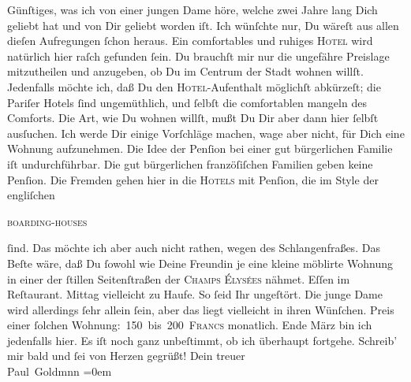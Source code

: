 \begin{ledgroupsized}[t]{13cm}
               Günſtiges,  was ich von einer jungen Dame höre, welche zwei Jahre
               lang Dich geliebt hat und von Dir geliebt worden iſt. {\pb}Ich wünſchte nur, Du wäreſt aus allen dieſen
               Aufregungen ſchon heraus.\pend
           \pstart
           Ein comfortables und ruhiges \textsc{Hotel} wird natürlich hier  raſch gefunden ſein. Du brauchſt mir nur die
               ungefähre  Preislage mitzutheilen und anzugeben,
               ob Du im Centrum der Stadt
               wohnen willſt. Jedenfalls möchte ich, daß Du den \textsc{Hotel}-Aufenthalt möglichſt abkürzeſt; die Pariſer Hotels ſind ungemüthlich, und ſelbſt die comfortablen mangeln des
               Comforts. Die Art, wie Du wohnen willſt, mußt Du Dir aber dann hier ſelbſt ausſuchen.
               Ich werde Dir einige Vorſchläge machen, wage aber nicht, für Dich {\pb}eine Wohnung aufzunehmen. Die Idee der Penſion bei
               einer gut bürgerlichen Familie iſt undurchführbar. Die gut bürgerlichen franzöſiſchen Familien geben
               keine Penſion. Die Fremden gehen hier in die \textsc{Hotels} mit
               Penſion, die im Style der engliſchen{ }\begin{otherlanguage}{english}\textsc{boarding-houses}\end{otherlanguage}{ }ſind. Das möchte ich aber auch nicht rathen, wegen
               des Schlangenfraßes. Das Beſte wäre, daß Du ſowohl wie Deine Freundin je eine kleine möblirte Wohnung in
               einer der ſtillen Seitenſtraßen der \textsc{Champs Élysées} nähmet. Eſſen im Reſtaurant. \strikeout{\textcolor{gray}{×}} Mittag vielleicht zu Haufe. {\pb}So ſeid Ihr
               ungeſtört. Die junge Dame
               wird allerdings ſehr allein ſein, aber das liegt vielleicht in ihren Wünſchen. Preis
               einer ſolchen Wohnung: 150 bis 200 \textsc{Francs} monatlich.\pend
           \pstart
            Ende März bin ich jedenfalls hier. Es iſt noch
               ganz unbeſtimmt, ob ich überhaupt fortgehe.\pend
           \pstart
           Schreib’ mir bald und ſei von Herzen gegrüßt!\pend
           \pstart
           Dein treuer {\\[\baselineskip]}\spacefill\mbox{Paul Goldmnn}\pend
           \leftskip=0em{}
         
         \endnumbering{}\end{ledgroupsized}  \newcommand{\dateiname}{L02804}\newcommand{\titel}{Paul Goldmann an Arthur Schnitzler, 24. 2. [1897]}\newcommand{\editorInnen}{Martin Anton Müller und Laura Untner}
      